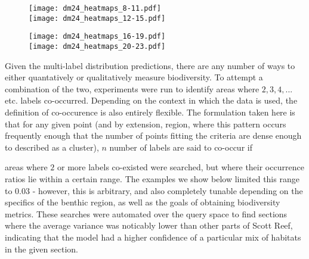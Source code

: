 \begin{figure}[H]
    \texttt{[image: dm24\_heatmaps\_8-11.pdf]}\\
    \texttt{[image: dm24\_heatmaps\_12-15.pdf]}
    \caption{}
    \label{fig:dm24_8-15}
\end{figure}

\begin{figure}[H]
    \texttt{[image: dm24\_heatmaps\_16-19.pdf]}\\
    \texttt{[image: dm24\_heatmaps\_20-23.pdf]}
    \caption{}
    \label{fig:dm24_16-23}
\end{figure}

Given the multi-label distribution predictions, there are any number of ways to either quantatively or qualitatively measure biodiversity. To attempt a combination of the two, experiments were run to identify areas where $2, 3, 4,...$ etc. labels co-occurred. Depending on the context in which the data is used, the definition of co-occurence is also entirely flexible. The formulation taken here is that for any given point (and by extension, region, where this pattern occurs frequently enough that the number of points fitting the criteria are dense enough to described as a cluster), $n$ number of labels are said to co-occur if 

areas where $2$ or more labels co-existed were searched, but where their occurrence ratios lie within a certain range. The examples we show below limited this range to $0.03$ - however, this is arbitrary, and also completely tunable depending on the specifics of the benthic region, as well as the goals of obtaining biodiversity metrics. These searches were automated over the query space to find sections where the average variance was noticably lower than other parts of Scott Reef, indicating that the model had a higher confidence of a particular mix of habitats in the given section.


